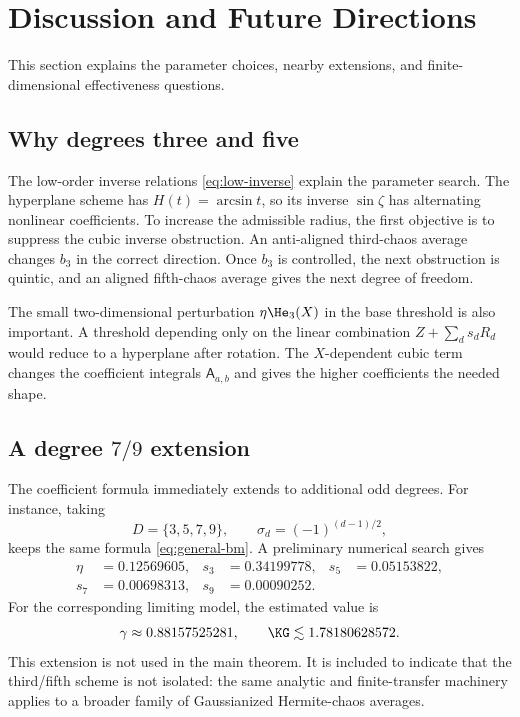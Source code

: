 \section{Discussion and Future Directions}
\label{sec:discussion}

This section explains the parameter choices, nearby extensions, and finite-dimensional effectiveness questions.

\subsection{Why degrees three and five}

The low-order inverse relations \eqref{eq:low-inverse} explain the parameter search.  The hyperplane scheme has $H(t)=\arcsin t$, so its inverse $\sin\zeta$ has alternating nonlinear coefficients.  To increase the admissible radius, the first objective is to suppress the cubic inverse obstruction.  An anti-aligned third-chaos average changes $b_3$ in the correct direction.  Once $b_3$ is controlled, the next obstruction is quintic, and an aligned fifth-chaos average gives the next degree of freedom.

The small two-dimensional perturbation $\eta \He_3(X)$ in the base threshold is also important.  A threshold depending only on the linear combination $Z+\sum_ds_dR_d$ would reduce to a hyperplane after rotation.  The $X$-dependent cubic term changes the coefficient integrals $\mathsf A_{a,b}$ and gives the higher coefficients the needed shape.

\subsection{A degree \texorpdfstring{$7/9$}{7/9} extension}

The coefficient formula immediately extends to additional odd degrees.  For instance, taking
\[
  D=\{3,5,7,9\},
  \qquad
  \sigma_d=(-1)^{(d-1)/2},
\]
keeps the same formula \eqref{eq:general-bm}.  A preliminary numerical search gives
\begin{align*}
  \eta&=0.12569605,&
  s_3&=0.34199778,&
  s_5&=0.05153822,\\
  s_7&=0.00698313,&
  s_9&=0.00090252.
\end{align*}
For the corresponding limiting model, the estimated value is
\[
  \gamma\approx0.88157525281,
  \qquad
  \KG\lesssim1.78180628572.
\]
This extension is not used in the main theorem.  It is included to indicate that the third/fifth scheme is not isolated: the same analytic and finite-transfer machinery applies to a broader family of Gaussianized Hermite-chaos averages.

